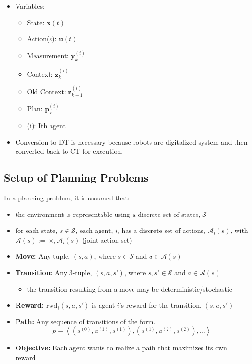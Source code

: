 \begin{summary}
    \begin{itemize}
        \item Variables:
        \begin{itemize}
            \item State: $\mathbf{x}(t)$
            \item Action(s): $\mathbf{u}(t)$
            \item Measurement: $\mathbf{y}_k^{(i)}$
            \item Context: $\mathbf{z}_k^{(i)}$
            \item Old Context: $\mathbf{z}_{k-1}^{(i)}$
            \item Plan: $\mathbf{p}_k^{(i)}$
            \item (i): Ith agent
        \end{itemize}
        \item Conversion to DT is necessary because robots are digitalized system and then converted back to CT for execution.
    \end{itemize}
\end{summary}

\subsection{Setup of Planning Problems}
\begin{definition}
In a planning problem, it is assumed that:
    \begin{itemize}
        \item the environment is representable using a discrete set of states, $\mathcal{S}$
        \item for each state, $s \in \mathcal{S}$, each agent, $i$, has a discrete set of actions, $\mathcal{A}_i(s)$, with $\mathcal{A}(s) := \times_i \mathcal{A}_i(s)$ (joint action set)
        \item \textbf{Move:} Any tuple, $(s, a)$, where $s \in \mathcal{S}$ and $a \in \mathcal{A}(s)$
        \item \textbf{Transition:} Any 3-tuple, $(s, a, s')$, where $s, s' \in \mathcal{S}$ and $a \in \mathcal{A}(s)$
        \begin{itemize}
            \item the transition resulting from a move may be deterministic/stochastic
        \end{itemize}
        \item \textbf{Reward:} $\text{rwd}_i(s, a, s')$ is agent $i$'s reward for the transition, $(s, a, s')$
        \item \textbf{Path:} Any sequence of transitions of the form.
        \[
        p = \left\langle (s^{(0)}, a^{(1)}, s^{(1)}), (s^{(1)}, a^{(2)}, s^{(2)}), \ldots \right\rangle
        \]
        \item \textbf{Objective:} Each agent wants to realize a path that maximizes its own reward
    \end{itemize}
\end{definition}

